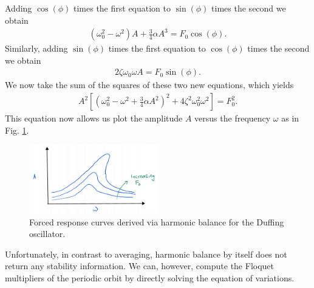 Adding $\cos(\phi)$ times the first equation to $\sin(\phi)$ times the second we obtain
\begin{align}
	\left( \omega _0^2 - \omega^2 \right) A + \frac{3}{4} \alpha A^3 = F_0 \cos (\phi).
\end{align}
Similarly, adding $\sin(\phi)$ times the first equation to $\cos(\phi)$ times the second we obtain
\begin{align}
	2 \zeta \omega_0 \omega A = F_0 \sin (\phi).
\end{align}
We now take the sum of the squares of these two new equations, which yields
\begin{align}
	A^2 \left[ \left( \omega _0^2 - \omega ^2 + \frac{3}{4} \alpha A^2 \right) ^2 + 4 \zeta^2 \omega_0^2 \omega ^2 \right] = F_0^2.
\end{align}
This equation now allows us plot the amplitude $A$ versus the frequency $\omega$ as in Fig. \ref{fig:forced_response2}.
\begin{figure}[h!]
	\centering
	\includegraphics[width=0.5\textwidth]{figures/ch5/12forced_response2.png}
	\caption{Forced response curves derived via harmonic balance for the Duffing oscillator.}
	\label{fig:forced_response2}
\end{figure}

Unfortunately, in contrast to averaging, harmonic balance by itself does not return any stability information. We can, however, compute the Floquet multipliers of the periodic orbit by directly solving the equation of variations. 

